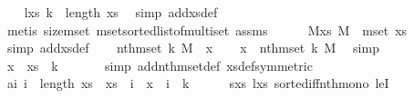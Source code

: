\begin{isabellebody}
\ \ \isamarkupfalse%
\ l{\isacharunderscore}{\kern0pt}xs{\isacharcolon}{\kern0pt}\ {\isachardoublequoteopen}k\ {\isacharless}{\kern0pt}\ length\ xs{\isachardoublequoteclose}\ \isamarkupfalse%
\ {\isacharparenleft}{\kern0pt}simp\ add{\isacharcolon}{\kern0pt}xs{\isacharunderscore}{\kern0pt}def{\isacharparenright}{\kern0pt}\ \isanewline
\ \ \ \ \isamarkupfalse%
\ {\isacharparenleft}{\kern0pt}metis\ size{\isacharunderscore}{\kern0pt}mset\ mset{\isacharunderscore}{\kern0pt}sorted{\isacharunderscore}{\kern0pt}list{\isacharunderscore}{\kern0pt}of{\isacharunderscore}{\kern0pt}multiset\ assms{\isacharparenleft}{\kern0pt}{}{\isacharparenright}{\kern0pt}{\isacharparenright}{\kern0pt}\ \ \isanewline
\ \ \isamarkupfalse%
\ M{\isacharunderscore}{\kern0pt}xs{\isacharcolon}{\kern0pt}\ {\isachardoublequoteopen}M\ {\isacharequal}{\kern0pt}\ mset\ xs{\isachardoublequoteclose}\ \isamarkupfalse%
\ {\isacharparenleft}{\kern0pt}simp\ add{\isacharcolon}{\kern0pt}xs{\isacharunderscore}{\kern0pt}def{\isacharparenright}{\kern0pt}\isanewline
\isanewline
\ \ \isamarkupfalse%
\ {\isachardoublequoteopen}{\isasymnot}{\isacharparenleft}{\kern0pt}nth{\isacharunderscore}{\kern0pt}mset\ k\ M\ {\isasymle}\ x{\isacharparenright}{\kern0pt}{\isachardoublequoteclose}\isanewline
\ \ \isamarkupfalse%
\ {\isachardoublequoteopen}x\ {\isacharless}{\kern0pt}\ nth{\isacharunderscore}{\kern0pt}mset\ k\ M{\isachardoublequoteclose}\ \isamarkupfalse%
\ simp\isanewline
\ \ \isamarkupfalse%
\ {\isachardoublequoteopen}x\ {\isacharless}{\kern0pt}\ xs\ {\isacharbang}{\kern0pt}\ k{\isachardoublequoteclose}\ \isanewline
\ \ \ \ \isamarkupfalse%
\ {\isacharparenleft}{\kern0pt}simp\ add{\isacharcolon}{\kern0pt}nth{\isacharunderscore}{\kern0pt}mset{\isacharunderscore}{\kern0pt}def\ xs{\isacharunderscore}{\kern0pt}def{\isacharbrackleft}{\kern0pt}symmetric{\isacharbrackright}{\kern0pt}{\isacharparenright}{\kern0pt}\isanewline
\ \ \isamarkupfalse%
\ a{\isacharcolon}{\kern0pt}{\isachardoublequoteopen}{\isasymAnd}i{\isachardot}{\kern0pt}\ i\ {\isacharless}{\kern0pt}\ length\ xs\ {\isasymand}\ xs\ {\isacharbang}{\kern0pt}\ i\ {\isasymle}\ x\ {\isasymLongrightarrow}\ i\ {\isacharless}{\kern0pt}\ k{\isachardoublequoteclose}\isanewline
\ \ \ \ \isamarkupfalse%
\ s{\isacharunderscore}{\kern0pt}xs\ l{\isacharunderscore}{\kern0pt}xs\ sorted{\isacharunderscore}{\kern0pt}iff{\isacharunderscore}{\kern0pt}nth{\isacharunderscore}{\kern0pt}mono\ leI\ \isamarkupfalse%

\end{isabellebody}
